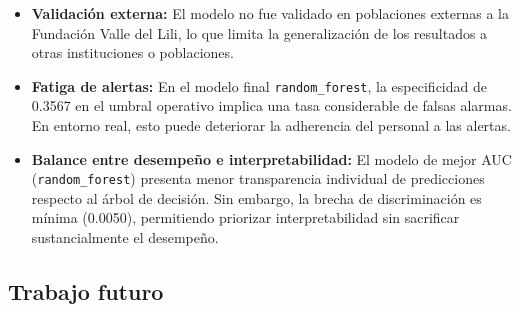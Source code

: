 \begin{itemize}
    \item \textbf{Validación externa:} El modelo no fue validado en poblaciones externas a la Fundación Valle del Lili, lo que limita la generalización de los resultados a otras instituciones o poblaciones.

    \item \textbf{Fatiga de alertas:} En el modelo final \texttt{random\_forest}, la especificidad de 0.3567 en el umbral operativo implica una tasa considerable de falsas alarmas. En entorno real, esto puede deteriorar la adherencia del personal a las alertas.

    \item \textbf{Balance entre desempeño e interpretabilidad:} El modelo de mejor AUC (\texttt{random\_forest}) presenta menor transparencia individual de predicciones respecto al árbol de decisión. Sin embargo, la brecha de discriminación es mínima (0.0050), permitiendo priorizar interpretabilidad sin sacrificar sustancialmente el desempeño.
\end{itemize}

\subsection{Trabajo futuro}

